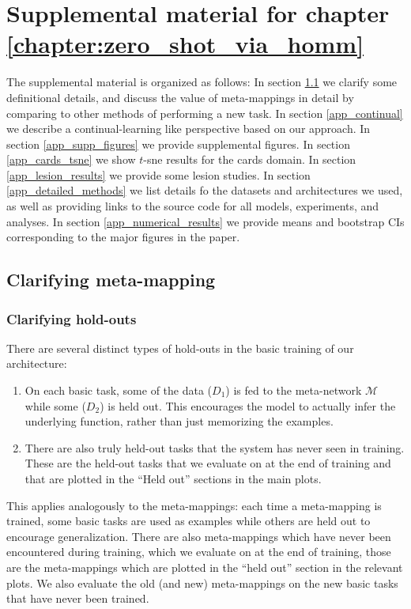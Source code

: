 \chapter{Supplemental material for chapter \ref{chapter:zero_shot_via_homm}} \label{appendix:zero_shot_via_homm}
The supplemental material is organized as follows: In section \ref{app_clarifying_meta_mapping} we clarify some definitional details, and discuss the value of meta-mappings in detail by comparing to other methods of performing a new task. In section 
\ref{app_continual} we describe a continual-learning like perspective based on our approach. In section \ref{app_supp_figures} we provide supplemental figures. In section \ref{app_cards_tsne} we show $t$-sne results for the cards domain. In section \ref{app_lesion_results} we provide some lesion studies. In section \ref{app_detailed_methods} we list details fo the datasets and architectures we used, as well as providing links to the source code for all models, experiments, and analyses. In section \ref{app_numerical_results} we provide means and bootstrap CIs corresponding to the major figures in the paper. \par  

\section{Clarifying meta-mapping} \label{app_clarifying_meta_mapping}
\subsection{Clarifying hold-outs} \label{app_clarifying_holdouts}
There are several distinct types of hold-outs in the basic training of our architecture:
\begin{enumerate}
\item On each basic task, some of the data ($D_1$) is fed to the meta-network $\mathcal{M}$ while some ($D_2$) is held out. This encourages the model to actually infer the underlying function, rather than just memorizing the examples.
\item There are also truly held-out tasks that the system has never seen in training. These are the held-out tasks that we evaluate on at the end of training and that are plotted in the ``Held out'' sections in the main plots.
\end{enumerate}
This applies analogously to the meta-mappings: each time a meta-mapping is trained, some basic tasks are used as examples while others are held out to encourage generalization. There are also meta-mappings which have never been encountered during training, which we evaluate on at the end of training, those are the meta-mappings which are plotted in the ``held out'' section in the relevant plots. We also evaluate the old (and new) meta-mappings on the new basic tasks that have never been trained. \par
